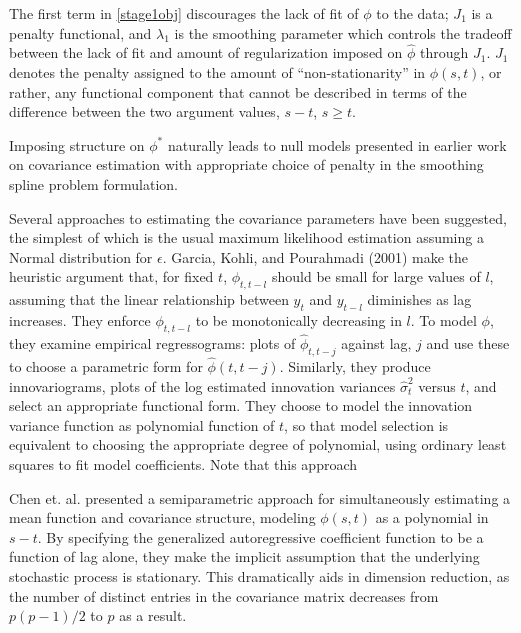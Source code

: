 The first term in \eqref{stage1obj} discourages the lack of fit of $\phi$ to the data; $J_1$ is a penalty functional, and $\lambda_1$ is the smoothing parameter which controls the tradeoff between the lack of fit and amount of regularization imposed on $\hat{\phi}$ through $J_1$.  $J_1$ denotes the penalty assigned to the amount of ``non-stationarity'' in $\phi\left(s,t\right)$, or rather, any functional component that cannot be described in terms of the difference between the two argument values, $s-t$, $s \ge t$. %


Imposing structure on $\phi^*$ naturally leads to null models presented in earlier work on covariance estimation with appropriate choice of penalty in the smoothing spline problem formulation. 
    
    
Several approaches to estimating the covariance parameters have been suggested, the simplest of which is the usual maximum likelihood estimation assuming a Normal distribution for $\epsilon$. Garcia, Kohli, and Pourahmadi (2001) make the heuristic argument that, for fixed $t$, $\phi_{t,t-l}$ should be small for large values of $l$, assuming that the linear relationship between $y_t$ and $y_{t-l}$ diminishes as lag increases. They enforce $\phi_{t,t-l}$ to be monotonically decreasing in $l$. 
To model $\phi$, they examine empirical regressograms: plots of $\hat{\phi}_{t,t-j}$ against lag, $j$ and use these to choose a parametric form for $\hat{\phi}\left(t,t-j\right)$. Similarly, they produce innovariograms, plots of the log estimated innovation variances $\hat{\sigma}_t^2$ versus $t$, and select an appropriate functional form. They choose to model the innovation variance function as polynomial function of $t$, so that model selection is equivalent to choosing the appropriate degree of polynomial, using ordinary least squares to fit model coefficients. Note that this approach 


Chen et. al. presented a semiparametric approach for simultaneously estimating a mean function and covariance structure, modeling $\phi\left(s,t\right)$ as a polynomial in $s-t$. By specifying the generalized autoregressive coefficient function to be a function of lag alone, they make the implicit assumption that the underlying stochastic process is stationary. This dramatically aids in dimension reduction, as the number of distinct entries in the covariance matrix decreases from $p\left(p-1\right)/2$ to $p$ as a result. 

